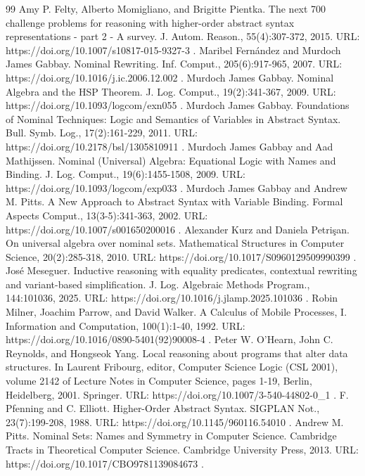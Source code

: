 \begin{thebibliography}{99}
 Amy P. Felty, Alberto Momigliano, and Brigitte Pientka. The next 700 challenge problems for reasoning with higher-order abstract syntax representations - part 2 - A survey. J. Autom. Reason., 55(4):307-372, 2015. URL: https://doi.org/10.1007/s10817-015-9327-3 .
 Maribel Fernández and Murdoch James Gabbay. Nominal Rewriting. Inf. Comput., 205(6):917-965, 2007. URL: https://doi.org/10.1016/j.ic.2006.12.002 .
 Murdoch James Gabbay. Nominal Algebra and the HSP Theorem. J. Log. Comput., 19(2):341-367, 2009. URL: https://doi.org/10.1093/logcom/exn055 .
 Murdoch James Gabbay. Foundations of Nominal Techniques: Logic and Semantics of Variables in Abstract Syntax. Bull. Symb. Log., 17(2):161-229, 2011. URL: https://doi.org/10.2178/bsl/1305810911 .
 Murdoch James Gabbay and Aad Mathijssen. Nominal (Universal) Algebra: Equational Logic with Names and Binding. J. Log. Comput., 19(6):1455-1508, 2009. URL: https://doi.org/10.1093/logcom/exp033 .
 Murdoch James Gabbay and Andrew M. Pitts. A New Approach to Abstract Syntax with Variable Binding. Formal Aspects Comput., 13(3-5):341-363, 2002. URL: https://doi.org/10.1007/s001650200016 .
 Alexander Kurz and Daniela Petrişan. On universal algebra over nominal sets. Mathematical Structures in Computer Science, 20(2):285-318, 2010. URL: https://doi.org/10.1017/S0960129509990399 .
 José Meseguer. Inductive reasoning with equality predicates, contextual rewriting and variant-based simplification. J. Log. Algebraic Methods Program., 144:101036, 2025. URL: https://doi.org/10.1016/j.jlamp.2025.101036 .
 Robin Milner, Joachim Parrow, and David Walker. A Calculus of Mobile Processes, I. Information and Computation, 100(1):1-40, 1992. URL: https://doi.org/10.1016/0890-5401(92)90008-4 .
 Peter W. O'Hearn, John C. Reynolds, and Hongseok Yang. Local reasoning about programs that alter data structures. In Laurent Fribourg, editor, Computer Science Logic (CSL 2001), volume 2142 of Lecture Notes in Computer Science, pages 1-19, Berlin, Heidelberg, 2001. Springer. URL: https://doi.org/10.1007/3-540-44802-0\_1 .
 F. Pfenning and C. Elliott. Higher-Order Abstract Syntax. SIGPLAN Not., 23(7):199-208, 1988. URL: https://doi.org/10.1145/960116.54010 .
 Andrew M. Pitts. Nominal Sets: Names and Symmetry in Computer Science. Cambridge Tracts in Theoretical Computer Science. Cambridge University Press, 2013. URL: https://doi.org/10.1017/CBO9781139084673 .

\end{thebibliography}
